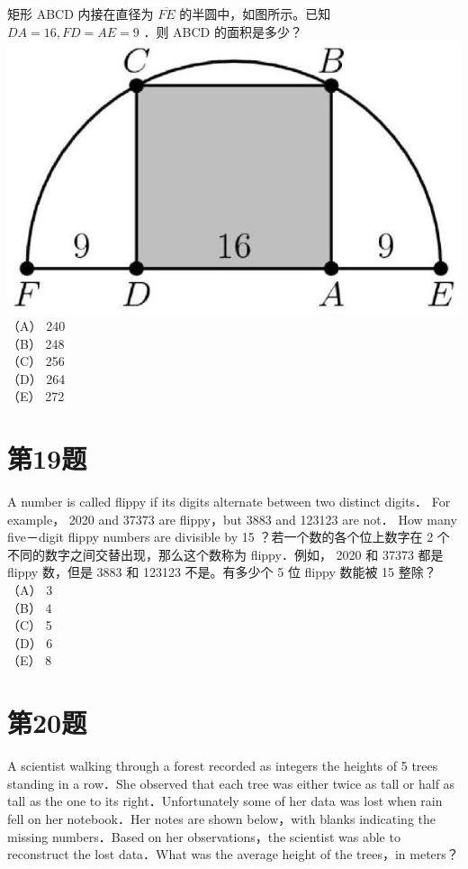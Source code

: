 \documentclass[10pt]{article}
\begin{document}
矩形 ABCD 内接在直径为 $\overline{F E}$ 的半圆中，如图所示。已知\\
$D A=16, F D=A E=9$ ．则 ABCD 的面积是多少？\\
\includegraphics[max width=\textwidth, center]{2025_09_05_48544237b06df716137eg-10}\\
（A） 240\\
（B） 248\\
（C） 256\\
（D） 264\\
（E） 272

\section*{第19题}
A number is called flippy if its digits alternate between two distinct digits． For example， 2020 and 37373 are flippy，but 3883 and 123123 are not． How many five－digit flippy numbers are divisible by 15 ？若一个数的各个位上数字在 2 个不同的数字之间交替出现，那么这个数称为 flippy．例如， 2020 和 37373 都是 flippy 数，但是 3883 和 123123 不是。有多少个 5 位 flippy 数能被 15 整除？\\
（A） 3\\
（B） 4\\
（C） 5\\
（D） 6\\
（E） 8

\section*{第20题}
A scientist walking through a forest recorded as integers the heights of 5 trees standing in a row．She observed that each tree was either twice as tall or half as tall as the one to its right．Unfortunately some of her data was lost when rain fell on her notebook．Her notes are shown below，with blanks indicating the missing numbers．Based on her observations，the scientist was able to reconstruct the lost data．What was the average height of the trees，in meters？
\end{document}
